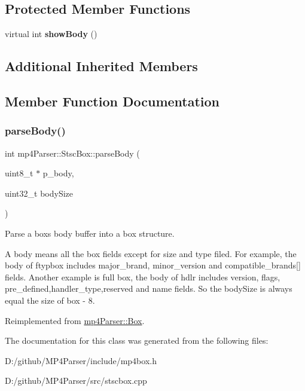 \subsection*{Protected Member Functions}
\begin{DoxyCompactItemize}
\item 
\mbox{\label{classmp4_parser_1_1_stsc_box_a56dc50199b8c617335a5d8b2cf898d0a}} 
virtual int {\bfseries show\+Body} ()
\end{DoxyCompactItemize}
\subsection*{Additional Inherited Members}


\subsection{Member Function Documentation}
\mbox{\label{classmp4_parser_1_1_stsc_box_a0f63518f8cef06e41b43b2d527a986ca}} 
\subsubsection{\texorpdfstring{parseBody()}{parseBody()}}
{\footnotesize\ttfamily int mp4\+Parser\+::\+Stsc\+Box\+::parse\+Body (\begin{DoxyParamCaption}\item[{uint8\+\_\+t $\ast$}]{p\+\_\+body,  }\item[{uint32\+\_\+t}]{body\+Size }\end{DoxyParamCaption})\hspace{0.3cm}{\ttfamily [virtual]}}



Parse a box\textquotesingle{}s body buffer into a box structure. 

A body means all the box fields except for size and type filed. For example, the body of ftypbox includes major\+\_\+brand, minor\+\_\+version and compatible\+\_\+brands\mbox{[}\mbox{]} fields. Another example is full box, the body of hdlr includes version, flags, pre\+\_\+defined,handler\+\_\+type,reserved and name fields. So the body\+Size is always equal the size of box -\/ 8. 

Reimplemented from \mbox{\hyperlink{classmp4_parser_1_1_box_a3dd0c084ac65bc77b69ac5ecaf796cb2}{mp4\+Parser\+::\+Box}}.



The documentation for this class was generated from the following files\+:\begin{DoxyCompactItemize}
\item 
D\+:/github/\+M\+P4\+Parser/include/mp4box.\+h\item 
D\+:/github/\+M\+P4\+Parser/src/stscbox.\+cpp\end{DoxyCompactItemize}
